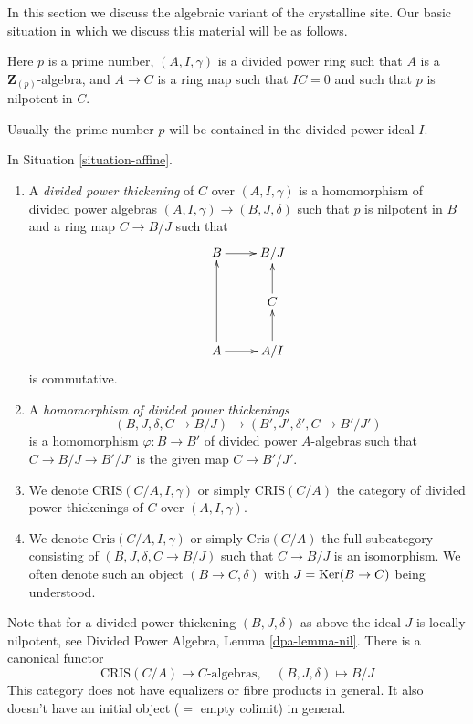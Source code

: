 \noindent
In this section we discuss the algebraic variant of the crystalline site.
Our basic situation in which we discuss this material will be as
follows.

\begin{situation}
\label{situation-affine}
Here $p$ is a prime number, $(A, I, \gamma)$ is a divided power
ring such that $A$ is a $\mathbf{Z}_{(p)}$-algebra, and $A \to C$ is a
ring map such that $IC = 0$ and such that $p$ is nilpotent in $C$.
\end{situation}

\noindent
Usually the prime number $p$ will be contained in the
divided power ideal $I$.

\begin{definition}
\label{definition-affine-thickening}
In Situation \ref{situation-affine}.
\begin{enumerate}
\item A {\it divided power thickening} of $C$ over $(A, I, \gamma)$
is a homomorphism of divided power algebras $(A, I, \gamma) \to (B, J, \delta)$
such that $p$ is nilpotent in $B$ and a ring map $C \to B/J$ such that
$$
\xymatrix{
B \ar[r] & B/J \\
& C \ar[u] \\
A \ar[uu] \ar[r] & A/I \ar[u]
}
$$
is commutative.
\item A {\it homomorphism of divided power thickenings}
$$
(B, J, \delta, C \to B/J) \longrightarrow (B', J', \delta', C \to B'/J')
$$
is a homomorphism $\varphi : B \to B'$ of divided power $A$-algebras such
that $C \to B/J \to B'/J'$ is the given map $C \to B'/J'$.
\item We denote $\text{CRIS}(C/A, I, \gamma)$ or simply $\text{CRIS}(C/A)$
the category of divided power thickenings of $C$ over $(A, I, \gamma)$.
\item We denote $\text{Cris}(C/A, I, \gamma)$ or simply $\text{Cris}(C/A)$
the full subcategory consisting of $(B, J, \delta, C \to B/J)$ such that
$C \to B/J$ is an isomorphism. We often denote such an object
$(B \to C, \delta)$ with $J = \mathop{\mathrm{Ker}}(B \to C)$ being understood.
\end{enumerate}
\end{definition}

\noindent
Note that for a divided power thickening $(B, J, \delta)$ as above
the ideal $J$ is locally nilpotent, see
Divided Power Algebra, Lemma \ref{dpa-lemma-nil}.
There is a canonical functor
\begin{equation}
\label{equation-forget-affine}
\text{CRIS}(C/A) \longrightarrow C\text{-algebras},\quad
(B, J, \delta) \longmapsto B/J
\end{equation}
This category does not have equalizers or fibre products in general.
It also doesn't have an initial object ($=$ empty colimit) in general.

